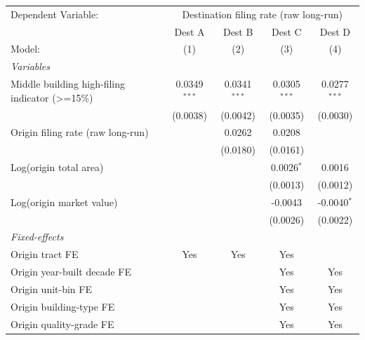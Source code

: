 \begingroup
\centering
\begin{tabular}{lcccc}
   \tabularnewline \midrule \midrule
   Dependent Variable: & \multicolumn{4}{c}{Destination filing rate (raw long-run)}\\
                                                   & Dest A         & Dest B         & Dest C         & Dest D \\   
   Model:                                          & (1)            & (2)            & (3)            & (4)\\  
   \midrule
   \emph{Variables}\\
   Middle building high-filing indicator (>=15\%)  & 0.0349$^{***}$ & 0.0341$^{***}$ & 0.0305$^{***}$ & 0.0277$^{***}$\\   
                                                   & (0.0038)       & (0.0042)       & (0.0035)       & (0.0030)\\   
   Origin filing rate (raw long-run)               &                & 0.0262         & 0.0208         &   \\   
                                                   &                & (0.0180)       & (0.0161)       &   \\   
   Log(origin total area)                          &                &                & 0.0026$^{*}$   & 0.0016\\   
                                                   &                &                & (0.0013)       & (0.0012)\\   
   Log(origin market value)                        &                &                & -0.0043        & -0.0040$^{*}$\\   
                                                   &                &                & (0.0026)       & (0.0022)\\   
   \midrule
   \emph{Fixed-effects}\\
   Origin tract FE                                 & Yes            & Yes            & Yes            & \\  
   Origin year-built decade FE                     &                &                & Yes            & Yes\\  
   Origin unit-bin FE                              &                &                & Yes            & Yes\\  
   Origin building-type FE                         &                &                & Yes            & Yes\\  
   Origin quality-grade FE                         &                &                & Yes            & Yes\\  

\end{tabular}
